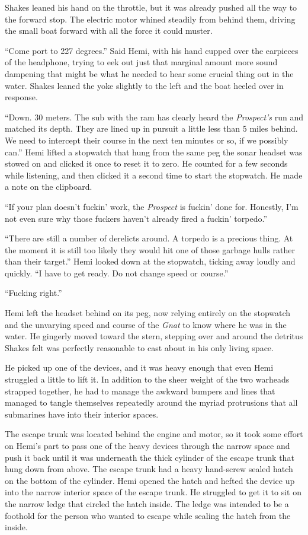 \documentclass[
]{scrbook}
\begin{document}
Shakes leaned his hand on the throttle, but it was already pushed all
the way to the forward stop. The electric motor whined steadily from
behind them, driving the small boat forward with all the force it could
muster.

``Come port to 227 degrees.'' Said Hemi, with his hand cupped over the
earpieces of the headphone, trying to eek out just that marginal amount
more sound dampening that might be what he needed to hear some crucial
thing out in the water. Shakes leaned the yoke slightly to the left and
the boat heeled over in response.

``Down. 30 meters. The sub with the ram has clearly heard the
\emph{Prospect's} run and matched its depth. They are lined up in
pursuit a little less than 5 miles behind. We need to intercept their
course in the next ten minutes or so, if we possibly can.'' Hemi lifted
a stopwatch that hung from the same peg the sonar headset was stowed on
and clicked it once to reset it to zero. He counted for a few seconds
while listening, and then clicked it a second time to start the
stopwatch. He made a note on the clipboard.

``If your plan doesn't fuckin' work, the \emph{Prospect} is fuckin' done
for. Honestly, I'm not even sure why those fuckers haven't already fired
a fuckin' torpedo.''

``There are still a number of derelicts around. A torpedo is a precious
thing. At the moment it is still too likely they would hit one of those
garbage hulls rather than their target.'' Hemi looked down at the
stopwatch, ticking away loudly and quickly. ``I have to get ready. Do
not change speed or course.''

``Fucking right.''

Hemi left the headset behind on its peg, now relying entirely on the
stopwatch and the unvarying speed and course of the \emph{Gnat} to know
where he was in the water. He gingerly moved toward the stern, stepping
over and around the detritus Shakes felt was perfectly reasonable to
cast about in his only living space.

He picked up one of the devices, and it was heavy enough that even Hemi
struggled a little to lift it. In addition to the sheer weight of the
two warheads strapped together, he had to manage the awkward bumpers and
lines that managed to tangle themselves repeatedly around the myriad
protrusions that all submarines have into their interior spaces.

The escape trunk was located behind the engine and motor, so it took
some effort on Hemi's part to pass one of the heavy devices through the
narrow space and push it back until it was underneath the thick cylinder
of the escape trunk that hung down from above. The escape trunk had a
heavy hand-screw sealed hatch on the bottom of the cylinder. Hemi opened
the hatch and hefted the device up into the narrow interior space of the
escape trunk. He struggled to get it to sit on the narrow ledge that
circled the hatch inside. The ledge was intended to be a foothold for
the person who wanted to escape while sealing the hatch from the inside.
\end{document}
